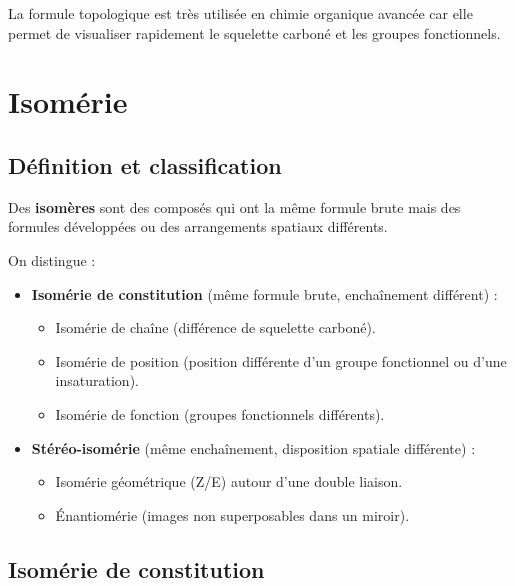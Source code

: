 \begin{remarque}
La formule topologique est très utilisée en chimie organique avancée car elle permet de visualiser rapidement le squelette carboné et les groupes fonctionnels.
\end{remarque}

\section{Isomérie}

\subsection{Définition et classification}

\begin{definition}[Isomères]
Des \textbf{isomères} sont des composés qui ont la même formule brute mais des formules développées ou des arrangements spatiaux différents.
\end{definition}

\begin{propriete}
On distingue :
\begin{itemize}
    \item \textbf{Isomérie de constitution} (même formule brute, enchaînement différent) :
        \begin{itemize}
            \item Isomérie de chaîne (différence de squelette carboné).
            \item Isomérie de position (position différente d'un groupe fonctionnel ou d'une insaturation).
            \item Isomérie de fonction (groupes fonctionnels différents).
        \end{itemize}
    \item \textbf{Stéréo-isomérie} (même enchaînement, disposition spatiale différente) :
        \begin{itemize}
            \item Isomérie géométrique (Z/E) autour d'une double liaison.
            \item Énantiomérie (images non superposables dans un miroir).
        \end{itemize}
\end{itemize}
\end{propriete}

\subsection{Isomérie de constitution}

